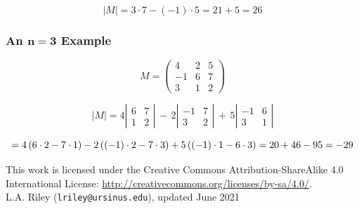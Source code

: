\documentclass[12pt]{article}
\begin{document}
\begin{equation}
|M| = 3 \cdot 7 - (-1)\cdot 5 = 21 + 5 = 26
\end{equation}

\subsubsection*{An $\mathbf{n=3}$ Example}

\begin{equation}
M =
\left(
\begin{array}{cccc}
 4 &  2 & 5 \\
-1 &  6 & 7 \\
 3 &  1 & 2
\end{array}
\right)
\end{equation}

\begin{equation}
|M| =
4
\left|
\begin{array}{cccc}
6 & 7 \\
1 & 2
\end{array}
\right| 
\,-\, 2
\left|
\begin{array}{cccc}
-1 & 7 \\
 3 & 2
\end{array}
\right| 
\,+\, 5
\left|
\begin{array}{cccc}
-1 & 6 \\
 3 & 1
\end{array}
\right|
\end{equation}

\begin{equation}
= 4 \, (6 \cdot 2 - 7 \cdot 1)
  - 2 \, ((-1) \cdot 2 - 7 \cdot 3)
  + 5 \, ((-1) \cdot 1 - 6 \cdot 3)\\
= 20 + 46 - 95 \\
= -29
\end{equation}

{\footnotesize
  \noindent
  \hrulefill
  
  \noindent
  This work is licensed under the Creative Commons
  Attribution-ShareAlike 4.0 International License: 
  \url{http://creativecommons.org/licenses/by-sa/4.0/}.\\

  \noindent
  L.A. Riley (\texttt{lriley@ursinus.edu}), updated June 2021
}
\end{document}
